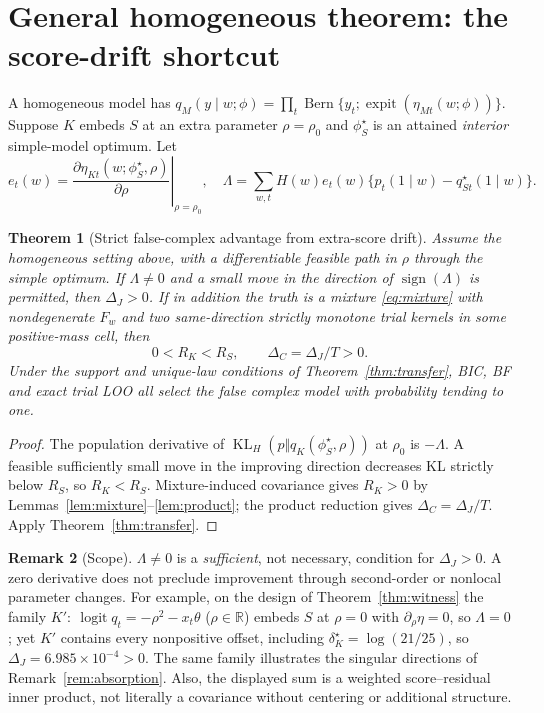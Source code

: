\documentclass[11pt,letterpaper]{article}
\theoremstyle{plain}
\newtheorem{theorem}{Theorem}[section]
\theoremstyle{definition}
\newtheorem{remark}[theorem]{Remark}
\newcommand{\KL}{\operatorname{KL}}
\newcommand{\Bern}{\operatorname{Bern}}
\newcommand{\logit}{\operatorname{logit}}
\newcommand{\sig}{\operatorname{expit}}
\begin{document}
\section{General homogeneous theorem: the score-drift shortcut}
A homogeneous model has $q_M(y\mid w;\phi)=\prod_t\Bern\{y_t;\sig(\eta_{Mt}(w;\phi))\}$. Suppose $K$ embeds $S$ at an extra parameter $\rho=\rho_0$ and $\phi_S^\star$ is an attained \emph{interior} simple-model optimum. Let
\[
e_t(w)=\left.\frac{\partial\eta_{Kt}(w;\phi_S^\star,\rho)}{\partial\rho}\right|_{\rho=\rho_0},\quad
\Lambda=\sum_{w,t}H(w)e_t(w)\{p_t(1\mid w)-q_{St}^\star(1\mid w)\}.
\]
\begin{theorem}[Strict false-complex advantage from extra-score drift]\label{thm:drift}
Assume the homogeneous setting above, with a differentiable feasible path in $\rho$ through the simple optimum. If $\Lambda\ne0$ and a small move in the direction of $\operatorname{sign}(\Lambda)$ is permitted, then $\Delta_J>0$. If in addition the truth is a mixture \eqref{eq:mixture} with nondegenerate $F_w$ and two same-direction strictly monotone trial kernels in some positive-mass cell, then
\[
0<R_K<R_S,\qquad \Delta_C=\Delta_J/T>0.
\]
Under the support and unique-law conditions of Theorem~\ref{thm:transfer}, BIC, BF and exact trial LOO all select the false complex model with probability tending to one.
\end{theorem}
\begin{proof}
The population derivative of $\KL_H(p\Vert q_K(\phi_S^\star,\rho))$ at $\rho_0$ is $-\Lambda$. A feasible sufficiently small move in the improving direction decreases KL strictly below $R_S$, so $R_K<R_S$. Mixture-induced covariance gives $R_K>0$ by Lemmas~\ref{lem:mixture}--\ref{lem:product}; the product reduction gives $\Delta_C=\Delta_J/T$. Apply Theorem~\ref{thm:transfer}.
\end{proof}
\begin{remark}[Scope]\label{rem:drift}
$\Lambda\ne0$ is a \emph{sufficient}, not necessary, condition for $\Delta_J>0$. A zero derivative does not preclude improvement through second-order or nonlocal parameter changes. For example, on the design of Theorem~\ref{thm:witness} the family $K':\ \logit q_t=-\rho^2-x_t\theta$ ($\rho\in\mathbb R$) embeds $S$ at $\rho=0$ with $\partial_\rho\eta=0$, so $\Lambda=0$; yet $K'$ contains every nonpositive offset, including $\delta_K^\star=\log(21/25)$, so $\Delta_J=6.985\times10^{-4}>0$. The same family illustrates the singular directions of Remark~\ref{rem:absorption}. Also, the displayed sum is a weighted score--residual inner product, not literally a covariance without centering or additional structure.
\end{remark}
\end{document}
